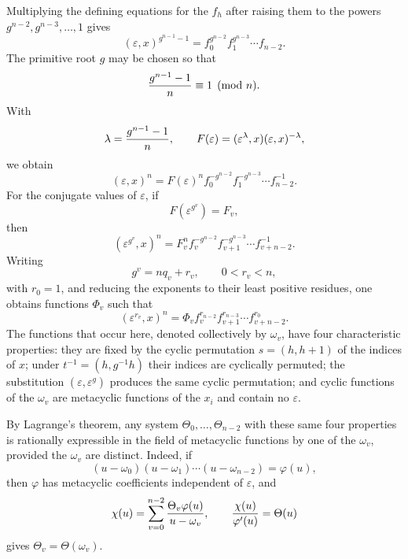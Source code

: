 \documentclass[11pt]{article}
\newcommand{\eps}{\varepsilon}
\begin{document}
Multiplying the defining equations for the $f_h$ after raising them to the powers $g^{n-2},g^{n-3},\ldots,1$ gives
\begin{equation}
  (\eps,x)^{g^{n-1}-1}=f_0^{g^{n-2}}f_1^{g^{n-3}}\cdots f_{n-2}.
\end{equation}
The primitive root $g$ may be chosen so that
\[
  {g^{n-1}-1\over n}\equiv1\pmod n.
\]
With
\begin{equation}
  \lambda={g^{n-1}-1\over n},\qquad
  F(\eps)=(\eps^\lambda,x)(\eps,x)^{-\lambda},
\end{equation}
we obtain
\begin{equation}
  (\eps,x)^n=F(\eps)^n f_0^{-g^{n-2}}f_1^{-g^{n-3}}\cdots f_{n-2}^{-1}.
\end{equation}
For the conjugate values of $\eps$, if
\begin{equation}
  F(\eps^{g^v})=F_v,
\end{equation}
then
\begin{equation}
  (\eps^{g^v},x)^n=F_v^n f_v^{-g^{n-2}}f_{v+1}^{-g^{n-3}}\cdots f_{v+n-2}^{-1}.
\end{equation}
Writing
\begin{equation}
  g^v=nq_v+r_v,\qquad 0<r_v<n,
\end{equation}
with $r_0=1$, and reducing the exponents to their least positive residues, one obtains functions $\Phi_v$ such that
\begin{equation}
  (\eps^{r_v},x)^n=\Phi_v f_v^{r_{n-2}}f_{v+1}^{r_{n-3}}\cdots f_{v+n-2}^{r_0}.
\end{equation}
The functions that occur here, denoted collectively by $\omega_v$, have four characteristic properties: they are fixed by the cyclic permutation $s=(h,h+1)$ of the indices of $x$; under $t^{-1}=(h,g^{-1}h)$ their indices are cyclically permuted; the substitution $(\eps,\eps^g)$ produces the same cyclic permutation; and cyclic functions of the $\omega_v$ are metacyclic functions of the $x_i$ and contain no $\eps$.

By Lagrange's theorem, any system $\Theta_0,\ldots,\Theta_{n-2}$ with these same four properties is rationally expressible in the field of metacyclic functions by one of the $\omega_v$, provided the $\omega_v$ are distinct. Indeed, if
\begin{equation}
  (u-
\omega_0)(u-
\omega_1)\cdots(u-\omega_{n-2})=\varphi(u),
\end{equation}
then $\varphi$ has metacyclic coefficients independent of $\eps$, and
\begin{equation}
  \chi(u)=\sum_{v=0}^{n-2}{\Theta_v\varphi(u)\over u-
\omega_v},\qquad
  {\chi(u)\over\varphi'(u)}=\Theta(u)
\end{equation}
gives $\Theta_v=\Theta(\omega_v)$.
\end{document}
